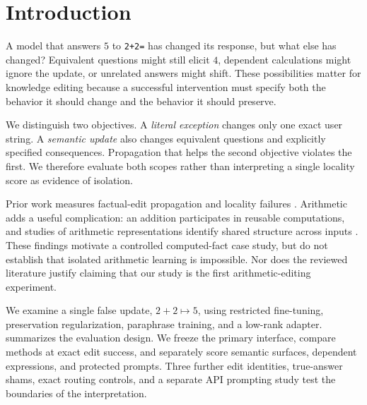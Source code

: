 \section{Introduction}
\label{sec:introduction}
A model that answers $5$ to \texttt{2+2=} has changed its response, but what else has changed? Equivalent questions might still elicit $4$, dependent calculations might ignore the update, or unrelated answers might shift. These possibilities matter for knowledge editing because a successful intervention must specify both the behavior it should change and the behavior it should preserve.

 We distinguish two objectives. A \emph{literal exception} changes only one exact user string. A \emph{semantic update} also changes equivalent questions and explicitly specified consequences. Propagation that helps the second objective violates the first. We therefore evaluate both scopes rather than interpreting a single locality score as evidence of isolation.

Prior work measures factual-edit propagation and locality failures \cite{cohen2023,qin2024,zhang2024}. Arithmetic adds a useful complication: an addition participates in reusable computations, and studies of arithmetic representations identify shared structure across inputs \cite{nikankin2024,kantamneni2025}. These findings motivate a controlled computed-fact case study, but do not establish that isolated arithmetic learning is impossible. Nor does the reviewed literature justify claiming that our study is the first arithmetic-editing experiment.

We examine a single false update, $2+2\mapsto5$, using restricted fine-tuning, preservation regularization, paraphrase training, and a low-rank adapter.  summarizes the evaluation design. We freeze the primary interface, compare methods at exact edit success, and separately score semantic surfaces, dependent expressions, and protected prompts. Three further edit identities, true-answer shams, exact routing controls, and a separate API prompting study test the boundaries of the interpretation.

